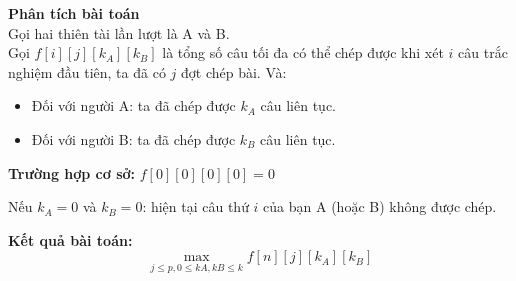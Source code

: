\textbf{Phân tích bài toán}\\

Gọi hai thiên tài lần lượt là A và B. \\

Gọi $f[i][j][k_A][k_B]$ là tổng số câu tối đa có thể chép được khi xét $i$ câu trắc nghiệm đầu tiên, ta đã có $j$ đợt chép bài. Và:
\begin{itemize}
    \item Đối với người A: ta đã chép được $k_A$ câu liên tục.
    \item Đối với người B: ta đã chép được $k_B$ câu liên tục.
\end{itemize}

\textbf{Trường hợp cơ sở:} $f[0][0][0][0] = 0$

Nếu $k_A = 0$ và $k_B = 0$: hiện tại câu thứ $i$ của bạn A (hoặc B) không được chép.

\textbf{Kết quả bài toán:} \[\max_{j \leq p, 0 \leq kA, kB \leq k} f[n][j][k_A][k_B]\] \\


\begin{lstlisting}[title=\centering\textbf{Cài đặt}]

\end{lstlisting}

